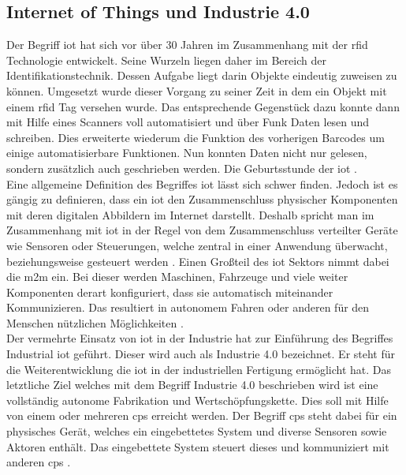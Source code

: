 \subsection{Internet of Things und Industrie 4.0}
\label{ss:grundlagen:iot}

\noindent Der Begriff \ac{iot} hat sich vor über 30 Jahren im Zusammenhang mit der \ac{rfid} Technologie entwickelt. Seine Wurzeln liegen daher im Bereich der Identifikationstechnik. Dessen Aufgabe liegt darin Objekte eindeutig zuweisen zu können. Umgesetzt wurde dieser Vorgang zu seiner Zeit in dem ein Objekt mit einem \ac{rfid} Tag versehen wurde. Das entsprechende Gegenstück dazu konnte dann mit Hilfe eines Scanners voll automatisiert und über Funk Daten lesen und schreiben. Dies erweiterte wiederum die Funktion des vorherigen Barcodes um einige automatisierbare Funktionen. Nun konnten Daten nicht nur gelesen, sondern zusätzlich auch geschrieben werden. Die Geburtsstunde der \ac{iot} \cite[Seite 37]{Holtschulte20:IOS}.\\

\noindent Eine allgemeine Definition des Begriffes \ac{iot} lässt sich schwer finden. Jedoch ist es gängig zu definieren, dass ein \ac{iot} den Zusammenschluss physischer Komponenten mit deren digitalen Abbildern im Internet darstellt. Deshalb spricht man im Zusammenhang mit \ac{iot} in der Regel von dem Zusammenschluss verteilter Geräte wie Sensoren oder Steuerungen, welche zentral in einer Anwendung überwacht, beziehungsweise gesteuert werden \cite[Seite 33]{Holtschulte20:IOS}. Einen Großteil des \ac{iot} Sektors nimmt dabei die \ac{m2m} ein. Bei dieser werden Maschinen, Fahrzeuge und viele weiter Komponenten derart konfiguriert, dass sie automatisch miteinander Kommunizieren. Das resultiert in autonomem Fahren oder anderen für den Menschen nützlichen Möglichkeiten \cite[Seite 449]{Holtschulte20:IOS}.\\

\noindent Der vermehrte Einsatz von \ac{iot} in der Industrie hat zur Einführung des Begriffes Industrial \ac{iot} geführt. Dieser wird auch als Industrie 4.0 bezeichnet. Er steht für die Weiterentwicklung die \ac{iot} in der industriellen Fertigung ermöglicht hat. Das letztliche Ziel welches mit dem Begriff Industrie 4.0 beschrieben wird ist eine vollständig autonome Fabrikation und Wertschöpfungskette. Dies soll mit Hilfe von einem oder mehreren \ac{cps} erreicht werden. Der Begriff \ac{cps} steht dabei für ein physisches Gerät, welches ein eingebettetes System und diverse Sensoren sowie Aktoren enthält. Das eingebettete System steuert dieses und kommuniziert mit anderen \ac{cps} \cite[Seite 30f]{Schell17:INS}.\\

